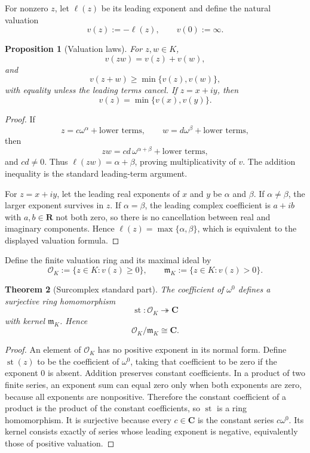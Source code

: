 \documentclass[11pt]{amsart}
\numberwithin{equation}{section}
\newtheorem{theorem}{Theorem}[section]
\newtheorem{proposition}[theorem]{Proposition}
\theoremstyle{definition}
\newcommand{\R}{\mathbf R}
\newcommand{\C}{\mathbf C}
\newcommand{\st}{\operatorname{st}}
\newcommand{\cO}{\mathcal O}
\begin{document}
For nonzero $z$, let $\ell(z)$ be its leading exponent and define the natural valuation
\[
v(z):=-\ell(z),
\qquad
v(0):=\infty.
\]

\begin{proposition}[Valuation laws]\label{prop:surcomplex-valuation}
For $z,w\in K$,
\[
v(zw)=v(z)+v(w),
\]
and
\[
v(z+w)\ge\min\{v(z),v(w)\},
\]
with equality unless the leading terms cancel.  If $z=x+iy$, then
\[
v(z)=\min\{v(x),v(y)\}.
\]
\end{proposition}

\begin{proof}
If
\[
z=c\omega^\alpha+\text{lower terms},
\qquad
w=d\omega^\beta+\text{lower terms},
\]
then
\[
zw=cd\,\omega^{\alpha+\beta}+\text{lower terms},
\]
and $cd\neq0$.  Thus $\ell(zw)=\alpha+\beta$, proving multiplicativity of $v$.  The addition inequality is the standard leading-term argument.

For $z=x+iy$, let the leading real exponents of $x$ and $y$ be $\alpha$ and $\beta$.  If $\alpha\neq\beta$, the larger exponent survives in $z$.  If $\alpha=\beta$, the leading complex coefficient is $a+ib$ with $a,b\in\R$ not both zero, so there is no cancellation between real and imaginary components.  Hence $\ell(z)=\max\{\alpha,\beta\}$, which is equivalent to the displayed valuation formula.
\end{proof}

Define the finite valuation ring and its maximal ideal by
\[
\cO_K:=\{z\in K:v(z)\ge0\},
\qquad
\mathfrak m_K:=\{z\in K:v(z)>0\}.
\]

\begin{theorem}[Surcomplex standard part]\label{thm:surcomplex-standard-part}
The coefficient of $\omega^0$ defines a surjective ring homomorphism
\[
\st:\cO_K\twoheadrightarrow\C
\]
with kernel $\mathfrak m_K$.  Hence
\[
\cO_K/\mathfrak m_K\cong\C.
\]
\end{theorem}

\begin{proof}
An element of $\cO_K$ has no positive exponent in its normal form.  Define $\st(z)$ to be the coefficient of $\omega^0$, taking that coefficient to be zero if the exponent $0$ is absent.  Addition preserves constant coefficients.  In a product of two finite series, an exponent sum can equal zero only when both exponents are zero, because all exponents are nonpositive.  Therefore the constant coefficient of a product is the product of the constant coefficients, so $\st$ is a ring homomorphism.  It is surjective because every $c\in\C$ is the constant series $c\omega^0$.  Its kernel consists exactly of series whose leading exponent is negative, equivalently those of positive valuation.
\end{proof}
\end{document}
